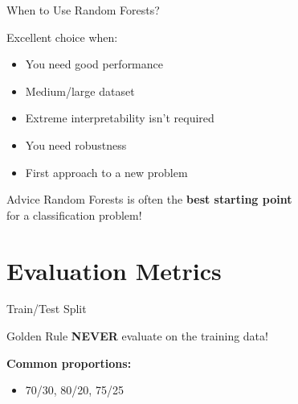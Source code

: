\documentclass[aspectratio=169]{beamer}
\begin{document}
\begin{frame}{When to Use Random Forests?}
\begin{block}{Excellent choice when:}
\begin{itemize}
    \item You need good performance
    \item Medium/large dataset
    \item Extreme interpretability isn't required
    \item You need robustness
    \item First approach to a new problem
\end{itemize}
\end{block}

\vspace{0.5cm}
\begin{alertblock}{Advice}
Random Forests is often the \textbf{best starting point}\\
for a classification problem!
\end{alertblock}
\end{frame}

\section{Evaluation Metrics}

\begin{frame}{Train/Test Split}
\begin{alertblock}{Golden Rule}
\textbf{NEVER} evaluate on the training data!
\end{alertblock}

\vspace{0.5cm}
\begin{center}
\end{center}

\vspace{0.5cm}
\textbf{Common proportions:}
\begin{itemize}
    \item 70/30, 80/20, 75/25
\end{itemize}
\end{frame}
\end{document}
